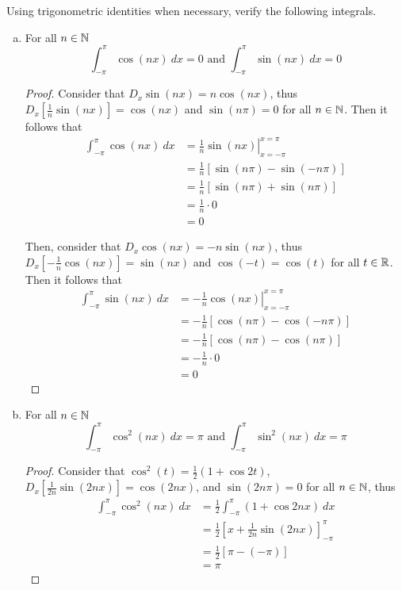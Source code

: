 \begin{problem}
    Using trigonometric identities when necessary, verify the following integrals.
    \begin{enumerate}[(a)]
        \item For all \(n \in \mathbb{N}\)
        \begin{equation}
        	\int_{-\pi}^{\pi} \cos(nx) ~dx = 0
        	\text{ and }
       		\int_{-\pi}^{\pi} \sin(nx) ~dx = 0
        \end{equation}
        
        \begin{proof}
        	Consider that \(D_x \sin(nx) = n\cos(nx)\), thus \(D_x\left[\frac{1}{n}\sin(nx)\right] = \cos(nx)\) and \(\sin(n\pi) = 0\) for all \(n \in \mathbb{N}\). Then it
			follows that
			\begin{align}
			\int_{-\pi}^{\pi} \cos(nx) ~dx & = \left.\frac{1}{n}\sin(nx)\right|_{x=-\pi}^{x=\pi} \\
			& = \frac{1}{n}\left[ \sin(n\pi) - \sin(-n\pi) \right] \\
			& = \frac{1}{n}\left[ \sin(n\pi) + \sin(n\pi) \right] \\
			& = \frac{1}{n} \cdot 0 \\
			& = 0
			\end{align}
			
			Then, consider that \(D_x \cos(nx) = -n\sin(nx)\), thus \(D_x\left[-\frac{1}{n} \cos(nx)\right] = \sin(nx)\) and \(\cos(-t) = \cos(t)\) for all \(t \in \mathbb{R}\). Then it
			follows that
			\begin{align}
			\int_{-\pi}^{\pi} \sin(nx) ~dx & = \left.-\frac{1}{n}\cos(nx)\right|_{x=-\pi}^{x=\pi} \\
			& = -\frac{1}{n}\left[ \cos(n\pi) - \cos(-n\pi) \right] \\
			& = -\frac{1}{n}\left[ \cos(n\pi) - \cos(n\pi) \right] \\
			& = -\frac{1}{n} \cdot 0 \\
			& = 0
			\end{align}
    	\end{proof}
	
        \item For all \(n \in \mathbb{N}\)
        \begin{equation}
        	\int_{-\pi}^{\pi} \cos^2(nx) ~dx = \pi
			\text{ and }
			\int_{-\pi}^{\pi} \sin^2(nx) ~dx = \pi
        \end{equation}
        
        \begin{proof}
        Consider that \(\cos^2(t) = \frac{1}{2}(1 + \cos{2t})\), \(D_x\left[\frac{1}{2n}\sin(2nx)\right] = \cos(2nx)\), and \(\sin(2n\pi) = 0\) for all \(n \in \mathbb{N}\), thus
        \begin{align}
        	\int_{-\pi}^{\pi} \cos^2(nx) ~dx & = \frac{1}{2}\int_{-\pi}^{\pi} (1 + \cos{2nx}) ~dx \\
			& = \frac{1}{2}\left[ x + \frac{1}{2n}\sin(2nx) \right]^\pi_{-\pi} \\
			& = \frac{1}{2}\left[ \pi - (-\pi) \right] \\
			& = \pi
        \end{align}
        

\end{proof}
\end{enumerate}
\end{problem}

